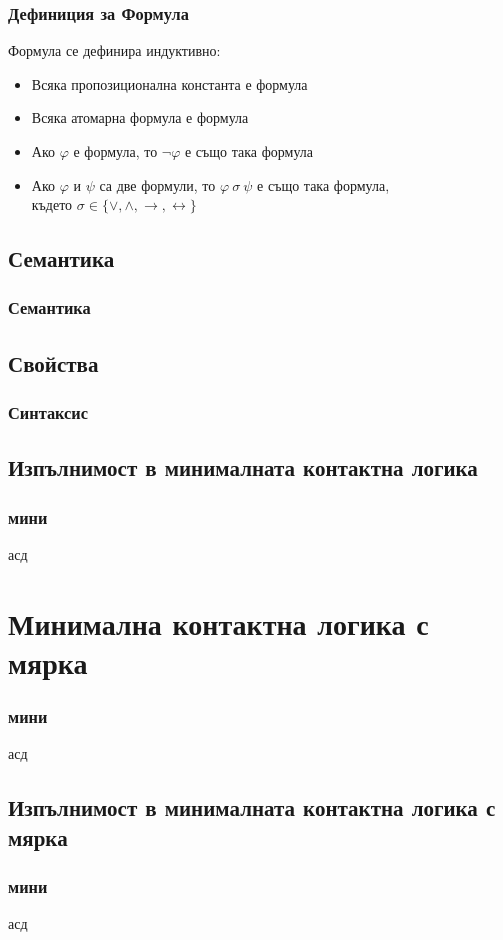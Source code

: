 \documentclass{beamer}
\begin{document}
\begin{frame}\frametitle{Дефиниция за Формула}
Формула се дефинира индуктивно:
		\begin{itemize}
			\item Всяка пропозиционална константа е формула
			\item Всяка атомарна формула е формула
			\item Ако $\varphi$ е формула, то $\neg{\varphi}$ е също така формула
			\item Ако $\varphi$ и $\psi$ са две формули, то $\varphi \: \sigma \: \psi $ е също така формула,\\
				където $\sigma \in \{\vee, \wedge, \rightarrow, \leftrightarrow\}$
		\end{itemize}
\end{frame}

\subsection{Семантика}
\begin{frame}\frametitle{Семантика}

\end{frame}

\subsection{Свойства}
\begin{frame}\frametitle{Синтаксис}

\end{frame}

\subsection{Изпълнимост в минималната контактна логика}
\begin{frame}\frametitle{мини}
асд
\end{frame}

\section{Минимална контактна логика с мярка}
\begin{frame}\frametitle{мини}
асд
\end{frame}

\subsection{Изпълнимост в минималната контактна логика с мярка}
\begin{frame}\frametitle{мини}
асд
\end{frame}
\end{document}
